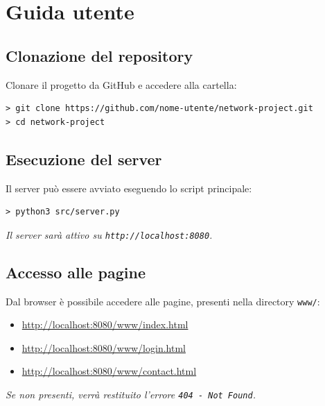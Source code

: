 \documentclass[a4paper,12pt]{report}
\begin{document}
\appendix
\chapter{Guida utente}
\section{Clonazione del repository}
Clonare il progetto da GitHub e accedere alla cartella:

\begin{verbatim}
> git clone https://github.com/nome-utente/network-project.git
> cd network-project
\end{verbatim}

\section{Esecuzione del server}
Il server può essere avviato eseguendo lo script principale:

\begin{verbatim}
> python3 src/server.py
\end{verbatim}

\noindent \textit{Il server sarà attivo su \texttt{http://localhost:8080}.}

\section{Accesso alle pagine}
Dal browser è possibile accedere alle pagine, presenti nella directory \texttt{www/}:

\begin{itemize}
    \item \url{http://localhost:8080/www/index.html}
    \item \url{http://localhost:8080/www/login.html}
    \item \url{http://localhost:8080/www/contact.html}
\end{itemize}

\noindent \textit{Se non presenti, verrà restituito l'errore \texttt{404 - Not Found}.}
\end{document}
